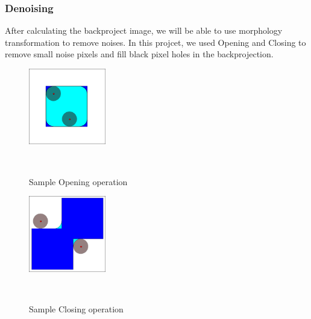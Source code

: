 \subsubsection{Denoising}
After calculating the backproject image, we will be able to use morphology transformation to remove noises. In this projcet, we used Opening and Closing to remove small noise pixels and fill black pixel holes in the backprojection.\\
\begin{figure}[h!]

  \centering
    \includegraphics[width=0.3\textwidth]{../Pictures/Opening.png}
    \caption{Sample Opening operation\cite{cite7}}\\
\end{figure}
\begin{figure}[h!]

  \centering
    \includegraphics[width=0.3\textwidth]{../Pictures/Closing.png}
    \caption{Sample Closing operation\cite{cite6}}\\
\end{figure}

